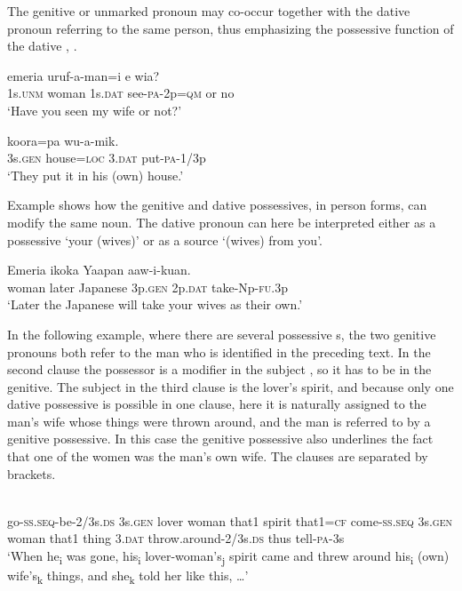 The genitive or unmarked pronoun may co-occur together with the dative pronoun referring to the same person, thus emphasizing the possessive function of the dative , .

\ea%
\label{ex:3:x1863}
\gll {} emeria  uruf-a-man=i e wia? \\
1s.\textsc{unm} woman 1s.\textsc{dat} see-\textsc{pa}-2p=\textsc{qm} or no\\
\glt`Have you seen my wife or not?'
\z

\ea%
\label{ex:3:x593}
\gll {} koora=pa  wu-a-mik. \\
3s.\textsc{gen} house=\textsc{loc} 3.\textsc{dat} put-\textsc{pa}-1/3p\\
\glt`They put it in his (own) house.'
\z

Example  shows how the genitive and dative possessives, in  person forms, can modify the same noun. The dative pronoun can here be interpreted either as a possessive `your (wives)' or as a source `(wives) from you'.

\ea%
\label{ex:3:x594}
\gll Emeria ikoka Yaapan   aaw-i-kuan. \\
woman later Japanese 3p.\textsc{gen} 2p.\textsc{dat} take-Np-\textsc{fu}.3p\\
\glt`Later the Japanese will take your wives as their own.'
\z

In the following example, where there are several possessive s, the two genitive pronouns both refer to the man who is identified in the preceding text. In the second clause the possessor is a modifier in the subject , so it has to be in the genitive. The subject in the third clause is the lover's spirit, and because only one dative possessive is possible in one clause, here it is naturally assigned to the man's wife whose things were thrown around, and the man is referred to by a genitive possessive. In this case the genitive possessive also underlines the fact that one of the women was the man's own wife. The clauses are separated by brackets.

\ea%
\label{ex:3:x1318}
\\
go-\textsc{ss}.\textsc{seq}-be-2/3s.\textsc{ds} 3s.\textsc{gen} lover woman that1 spirit that1=\textsc{cf} come-\textsc{ss}.\textsc{seq} 3s.\textsc{gen} woman that1 thing 3.\textsc{dat} throw.around-2/3s.\textsc{ds} thus tell-\textsc{pa}-3s\\
\glt`When he\textsubscript{i} was gone, his\textsubscript{i} lover-woman's\textsubscript{j} spirit came and threw around his\textsubscript{i} (own) wife's\textsubscript{k} things, and she\textsubscript{k} told her like this, {\dots}'
\z

